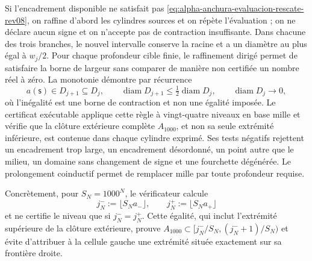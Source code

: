 Si l'encadrement disponible ne satisfait pas \eqref{eq:alpha-anchura-evaluacion-rescate-rev08}, on raffine d'abord les cylindres sources et on répète l'évaluation ; on ne déclare aucun signe et on n'accepte pas de contraction insuffisante. Dans chacune des trois branches, le nouvel intervalle conserve la racine et a un diamètre au plus égal à \(w_j/2\). Pour chaque profondeur cible finie, le raffinement dirigé permet de satisfaire la borne de largeur sans comparer de manière non certifiée un nombre réel à zéro. La monotonie démontre par récurrence
\begin{equation}
 a(\mathsf s)\in D_{j+1}\subseteq D_j,\qquad
 \operatorname{diam}D_{j+1}\leq
 \tfrac12\operatorname{diam}D_j,
 \qquad \operatorname{diam}D_j\longrightarrow0,
 \label{eq:alpha-biseccion-racional}
\end{equation}
où l'inégalité est une borne de contraction et non une égalité imposée.
Le certificat exécutable applique
cette règle à vingt-quatre niveaux en base mille et vérifie que la clôture
extérieure complète \(A_{1000}\), et non sa seule extrémité inférieure, est contenue dans
chaque cylindre exprimé. Ses tests négatifs rejettent un encadrement trop
large, un encadrement désordonné, un point autre que le milieu, un domaine sans
changement de signe et une fourchette dégénérée. Le prolongement coinductif permet
de remplacer mille par toute profondeur requise.

Concrètement, pour \(S_N=1000^N\), le vérificateur calcule
\begin{equation}
 j_N^-:=\lfloor S_Na_-\rfloor,
 \qquad j_N^+:=\lfloor S_Na_+\rfloor
 \label{eq:alpha-indices-cilindro-dirigidos-rev08}
\end{equation}
et ne certifie le niveau que si \(j_N^-=j_N^+\). Cette égalité, qui inclut
l’extrémité supérieure de la clôture extérieure, prouve
\(A_{1000}\subset[j_N^-/S_N,(j_N^-+1)/S_N)\) et évite d’attribuer à la cellule
gauche une extrémité située exactement sur sa frontière droite.

